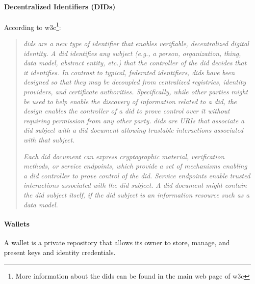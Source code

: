 \documentclass[a4paper, 12pt]{article} %
\begin{document}
                \paragraph{Decentralized Identifiers (DIDs)}
                    According to \acrshort{w3c}\cite{w3c-did}\footnote{More information about the \acrshort{did}s can be found in the main web page of \acrshort{w3c}\cite{w3c-did}}:
                    \begin{quote}
                        \textit{\acrfull{did}s are a new type of identifier that enables verifiable, decentralized digital identity. A \acrshort{did} identifies any subject (e.g., a person, organization, thing, data model, abstract entity, etc.) that the controller of the \acrshort{did} decides that it identifies. In contrast to typical, federated identifiers, \acrshort{did}s have been designed so that they may be decoupled from centralized registries, identity providers, and certificate authorities. Specifically, while other parties might be used to help enable the discovery of information related to a \acrshort{did}, the design enables the controller of a \acrshort{did} to prove control over it without requiring permission from any other party. \acrshort{did}s are URIs that associate a \acrshort{did} subject with a \acrshort{did} document allowing trustable interactions associated with that subject.}
                        
                        \textit{Each \acrshort{did} document can express cryptographic material, verification methods, or service endpoints, which provide a set of mechanisms enabling a \acrshort{did} controller to prove control of the \acrshort{did}. Service endpoints enable trusted interactions associated with the \acrshort{did} subject. A \acrshort{did} document might contain the \acrshort{did} subject itself, if the \acrshort{did} subject is an information resource such as a data model.}
                    \end{quote}
                    
                \paragraph{Wallets}
                    A wallet\cite{ssi-wallets} is a private repository that allows its owner to store, manage, and present keys and identity credentials.\\
                    
\end{document}
